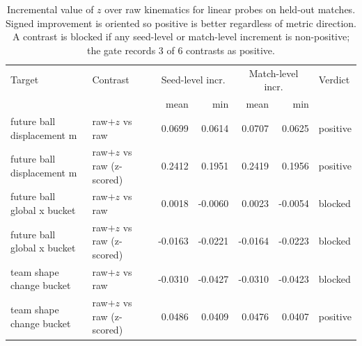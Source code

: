 \begin{table}[t]
  \centering
  \small
  \begin{tabular}{llrrrrl}
    \toprule
    Target & Contrast & \multicolumn{2}{c}{Seed-level incr.} & \multicolumn{2}{c}{Match-level incr.} & Verdict \\
    & & mean & min & mean & min & \\
    \midrule
    future ball displacement m & raw$+z$ vs raw & 0.0699 & 0.0614 & 0.0707 & 0.0625 & \textcolor[HTML]{2a78d6}{positive} \\
    future ball displacement m & raw$+z$ vs raw (z-scored) & 0.2412 & 0.1951 & 0.2419 & 0.1956 & \textcolor[HTML]{2a78d6}{positive} \\
    future ball global x bucket & raw$+z$ vs raw & 0.0018 & -0.0060 & 0.0023 & -0.0054 & \textcolor[HTML]{e34948}{blocked} \\
    future ball global x bucket & raw$+z$ vs raw (z-scored) & -0.0163 & -0.0221 & -0.0164 & -0.0223 & \textcolor[HTML]{e34948}{blocked} \\
    team shape change bucket & raw$+z$ vs raw & -0.0310 & -0.0427 & -0.0310 & -0.0423 & \textcolor[HTML]{e34948}{blocked} \\
    team shape change bucket & raw$+z$ vs raw (z-scored) & 0.0486 & 0.0409 & 0.0476 & 0.0407 & \textcolor[HTML]{2a78d6}{positive} \\
    \bottomrule
  \end{tabular}
  \caption{Incremental value of $z$ over raw kinematics for linear probes on held-out matches. Signed improvement is oriented so positive is better regardless of metric direction. A contrast is blocked if any seed-level or match-level increment is non-positive; the gate records 3 of 6 contrasts as positive.}
  \label{tab:probes}
\end{table}
